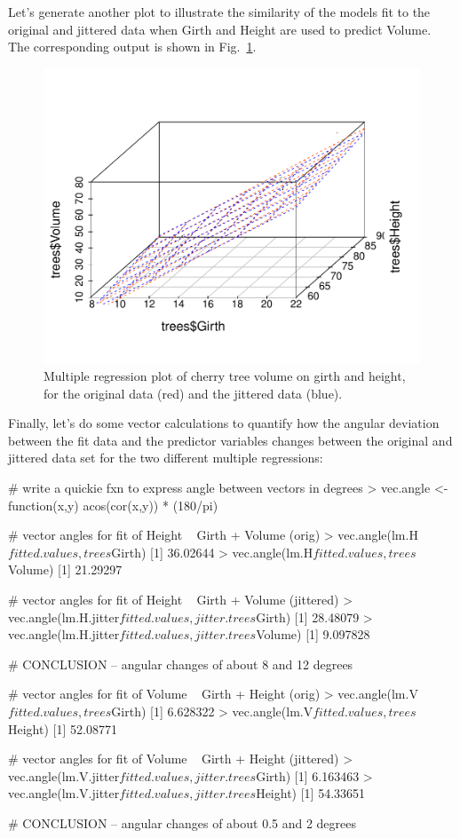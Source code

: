 Let's generate another plot to illustrate the similarity of the models fit to the original and jittered data when Girth and Height are used to predict Volume. The corresponding output is shown in Fig.~\ref{fig:jittervolume}.
%
%
\begin{figure}[htbp]
\centering
\includegraphics[width=0.5\columnwidth]{./figures/hands-on4/trees-jitterfit-volume.pdf}
\caption{Multiple regression plot of cherry tree volume on girth and height, for the original data (red) and the jittered data (blue).\label{fig:jittervolume}}
\end{figure}

Finally, let's do some vector calculations to quantify how the angular deviation between the fit data and the predictor variables changes between the original and jittered data set for the two different multiple regressions:
%
\begin{R}

# write a quickie fxn to express angle between vectors in degrees
> vec.angle <- function(x,y) { acos(cor(x,y)) * (180/pi)}

# vector angles for fit of Height ~ Girth + Volume (orig)
> vec.angle(lm.H$fitted.values, trees$Girth)
[1] 36.02644
> vec.angle(lm.H$fitted.values, trees$Volume)
[1] 21.29297

# vector angles for fit of Height ~ Girth + Volume (jittered)
> vec.angle(lm.H.jitter$fitted.values, jitter.trees$Girth)
[1] 28.48079
> vec.angle(lm.H.jitter$fitted.values, jitter.trees$Volume)
[1] 9.097828

# CONCLUSION -- angular changes of about 8 and 12 degrees 


# vector angles for fit of Volume ~ Girth + Height (orig)
> vec.angle(lm.V$fitted.values, trees$Girth)
[1] 6.628322
> vec.angle(lm.V$fitted.values, trees$Height)
[1] 52.08771

# vector angles for fit of Volume ~ Girth + Height (jittered)
> vec.angle(lm.V.jitter$fitted.values, jitter.trees$Girth)
[1] 6.163463
> vec.angle(lm.V.jitter$fitted.values, jitter.trees$Height)
[1] 54.33651

# CONCLUSION -- angular changes of about 0.5 and 2 degrees
\end{R}
